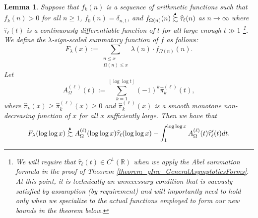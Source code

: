 \documentclass[11pt,reqno,a4letter]{article}
\numberwithin{figure}{section}
\numberwithin{table}{section}
\newcommand{\floor}[1]{\left\lfloor #1 \right\rfloor}
\theoremstyle{plain}
\newtheorem{lemma}[theorem]{Lemma}
\numberwithin{theorem}{section}
\theoremstyle{definition}
\newcommand{\SuccSim}[0]{\overset{_{\scriptsize{\blacktriangle}}}{\succsim}}
\begin{document}
\begin{lemma} 
\label{lemma_CLT_and_AbelSummation} 
Suppose that $f_k(n)$ is a sequence of arithmetic functions 
such that $f_k(n) > 0$ for all $n \geq 1$, $f_0(n) = \delta_{n,1}$, and 
$f_{\Omega(n)}(n) \SuccSim \widehat{\tau}_{\ell}(n)$ as $n \rightarrow \infty$ where 
$\widehat{\tau}_{\ell}(t)$ is a continuously differentiable function of $t$ for all 
large enough $t \gg 1$ \footnote{ 
     We will require that $\widehat{\tau}_{\ell}(t) \in C^{1}(\mathbb{R})$ when we apply the 
     Abel summation formula in the proof of Theorem \ref{theorem_gInv_GeneralAsymptoticsForms}. 
     At this point, it is technically an unnecessary condition that is 
     vacously satisfied by assumption (by requirement) 
     and will importantly need to hold only when we specialize to the 
     actual functions employed to form our new bounds in the theorem below. 
}.  
We define the $\lambda$-sign-scaled summatory function of $f$ as follows: 
\[
F_{\lambda}(x) := \sum_{\substack{n \leq x \\ \Omega(n) \leq x}} 
     \lambda(n) \cdot f_{\Omega(n)}(n). 
\]
Let 
\[
A_{\Omega}^{(\ell)}(t) := \sum_{k=1}^{\floor{\log\log t}} (-1)^k \widehat{\pi}_k^{(\ell)}(t),  
\]
where $\widehat{\pi}_k(x) \geq \widehat{\pi}_k^{(\ell)}(x) \geq 0$ and 
$\widehat{\pi}_k^{(\ell)}(x)$ is a smooth monotone non-decreasing function of $x$ for all $x$ 
sufficiently large. 
Then we have that 
\[
F_{\lambda}(\log\log x) \SuccSim 
     A_{\Omega}^{(\ell)}(\log\log x) \widehat{\tau}_{\ell}(\log\log x) - 
     \int_1^{\log\log x} 
     A_{\Omega}^{(\ell)}(t) \widehat{\tau}_{\ell}^{\prime}(t) dt.  
\]
\end{lemma}
\end{document}
